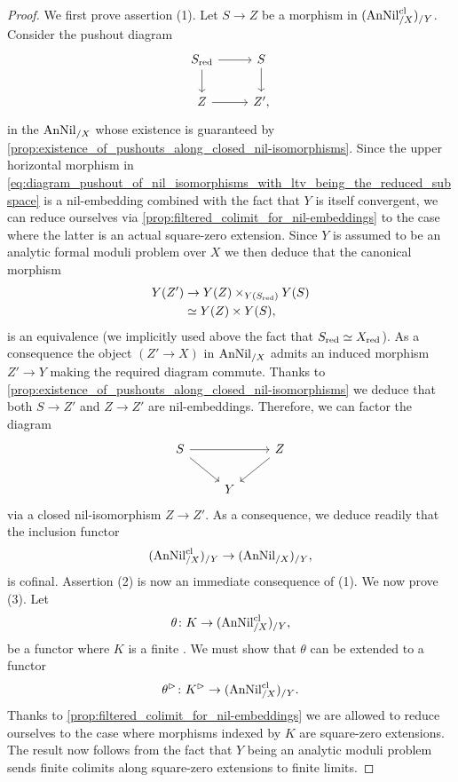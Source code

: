 \documentclass[10pt,a4paper,reqno]{amsart} %
\theoremstyle{plain}
\theoremstyle{definition}
\theoremstyle{remark}
\numberwithin{equation}{section}
\begin{document}
\begin{proof}
    We first prove assertion (1). Let $S \to Z$ be a morphism in $(\mathrm{AnNil}^{\mathrm{cl}}_{/X})_{/Y}$. Consider the pushout diagram
        \begin{equation} \label{eq:diagram_pushout_of_nil_isomorphisms_with_ltv_being_the_reduced_subspace}
        \begin{tikzcd}
            S_\red \ar{r} \ar{d} & S \ar{d} \\
            Z \ar{r} & Z',
        \end{tikzcd}
        \end{equation}
    in the \infcat $\mathrm{AnNil}_{/X}$ whose existence is guaranteed by \cref{prop:existence_of_pushouts_along_closed_nil-isomorphisms}. Since
    the upper horizontal morphism in \eqref{eq:diagram_pushout_of_nil_isomorphisms_with_ltv_being_the_reduced_subspace} is a nil-embedding
    combined with the fact that $Y$ is itself convergent, we can reduce
    ourselves via \cref{prop:filtered_colimit_for_nil-embeddings} to the case where the latter is an actual square-zero extension.
    Since $Y$ is assumed to be an analytic formal moduli problem over $X$ we then deduce that the canonical morphism
        \begin{align*}
            Y(Z') & \to Y(Z) \times_{Y(S_{\mathrm{red}})} Y(S) \\
            &\simeq Y(Z) \times Y(S),  
        \end{align*}
    is an equivalence (we implicitly used above the fact that $S_{\mathrm{red}} \simeq X_{\mathrm{red}}$). As a consequence the object $(Z' \to X)$ in $\mathrm{AnNil}_{/X}$ admits an induced morphism
    $Z' \to Y$ making the required diagram commute.
    Thanks to \cref{prop:existence_of_pushouts_along_closed_nil-isomorphisms} we deduce that both
    $S \to Z'$ and $Z \to Z'$ are nil-embeddings. Therefore, we can factor the diagram
        \[
        \begin{tikzcd}
            S \ar{rr} \ar{rd} & & Z \ar{dl} \\
                &               Y       &  
        \end{tikzcd}
        \]
    via a closed nil-isomorphism $Z \to Z'$. As a consequence, we deduce readily that the inclusion functor
        \[(\mathrm{AnNil}^{\mathrm{cl}}_{/X})_{/Y} \to (\mathrm{AnNil}_{/X})_{/Y},\]
    is cofinal.
    Assertion (2) is now an immediate consequence of (1). We now prove (3). Let 
        \[\theta \colon K \to (\mathrm{AnNil}^{\mathrm{cl}}_{/X})_{/Y},\]
    be a functor where
    $K$ is a finite \infcat. We must show that $\theta$ can be extended to a functor
        \[\theta^{\rhd} \colon K^{\rhd} \to (\mathrm{AnNil}^{\mathrm{cl}}_{/X})_{/Y}.\]
    Thanks to \cref{prop:filtered_colimit_for_nil-embeddings} we are allowed to reduce ourselves to the case where morphisms indexed by $K$
    are square-zero extensions. The result now follows from the fact that $Y$ being an analytic moduli problem sends finite colimits along square-zero extensions
    to finite limits.
\end{proof}
\end{document}

